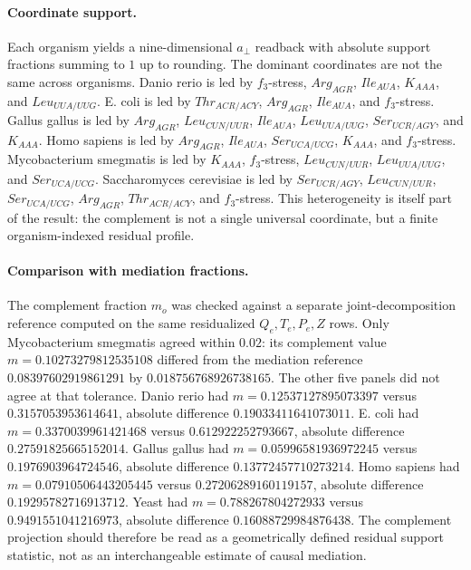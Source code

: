 \paragraph{Coordinate support.}
Each organism yields a nine-dimensional $a_\perp$ readback with absolute support fractions summing to $1$ up to rounding.  The dominant coordinates are not the same across organisms.  Danio rerio is led by $f_3$-stress, $Arg_{AGR}$, $Ile_{AUA}$, $K_{AAA}$, and $Leu_{UUA/UUG}$.  E. coli is led by $Thr_{ACR/ACY}$, $Arg_{AGR}$, $Ile_{AUA}$, and $f_3$-stress.  Gallus gallus is led by $Arg_{AGR}$, $Leu_{CUN/UUR}$, $Ile_{AUA}$, $Leu_{UUA/UUG}$, $Ser_{UCR/AGY}$, and $K_{AAA}$.  Homo sapiens is led by $Arg_{AGR}$, $Ile_{AUA}$, $Ser_{UCA/UCG}$, $K_{AAA}$, and $f_3$-stress.  Mycobacterium smegmatis is led by $K_{AAA}$, $f_3$-stress, $Leu_{CUN/UUR}$, $Leu_{UUA/UUG}$, and $Ser_{UCA/UCG}$.  Saccharomyces cerevisiae is led by $Ser_{UCR/AGY}$, $Leu_{CUN/UUR}$, $Ser_{UCA/UCG}$, $Arg_{AGR}$, $Thr_{ACR/ACY}$, and $f_3$-stress.  This heterogeneity is itself part of the result: the complement is not a single universal coordinate, but a finite organism-indexed residual profile.

\paragraph{Comparison with mediation fractions.}
The complement fraction $m_o$ was checked against a separate joint-decomposition reference computed on the same residualized $Q_e,T_e,P_e,Z$ rows.  Only Mycobacterium smegmatis agreed within $0.02$: its complement value $m=0.10273279812535108$ differed from the mediation reference $0.08397602919861291$ by $0.018756768926738165$.  The other five panels did not agree at that tolerance.  Danio rerio had $m=0.12537127895073397$ versus $0.3157053953614641$, absolute difference $0.19033411641073011$.  E. coli had $m=0.3370039961421468$ versus $0.612922252793667$, absolute difference $0.27591825665152014$.  Gallus gallus had $m=0.05996581936972245$ versus $0.1976903964724546$, absolute difference $0.13772457710273214$.  Homo sapiens had $m=0.07910506443205445$ versus $0.27206289160119157$, absolute difference $0.19295782716913712$.  Yeast had $m=0.788267804272933$ versus $0.9491551041216973$, absolute difference $0.16088729984876438$.  The complement projection should therefore be read as a geometrically defined residual support statistic, not as an interchangeable estimate of causal mediation.

